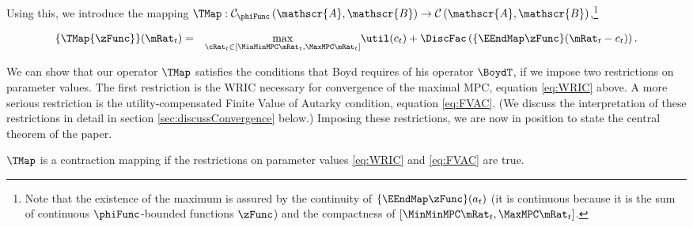 \documentclass[titlepage]{\econtex}\providecommand{\texname}{BufferStockTheory}
\begin{document}
Using this, we introduce the mapping \textit{$\TMap:\mathcal{C}_{\phiFunc }\left( \mathscr{A},\mathscr{B}\right) \rightarrow \mathcal{C}\left(
    \mathscr{A},\mathscr{B}\right) $},\footnote{Note that the existence of the maximum is assured by the continuity of $\{\EEndMap \zFunc\}(a_{t})$ (it is continuous because it is the sum of continuous $\phiFunc$-bounded functions $\zFunc$) and the compactness of $[\MinMinMPC \mRat_{t},  \MaxMPC \mRat_{t}]$.}
\begin{comment} %
(In the subtle case when $\MinMinMPC=0$, the compact interval could be revised as $ [(\MinMinMPC+\epsilon) \mRat_{t},
  \MaxMPC \mRat_{t}]$ where $\epsilon$ is a very small positive number because obviously $\MinMinMPC \mRat_{t}=0$ will not be the $\argmax$)
\end{comment}
\begin{eqnarray}
\{\TMap{\zFunc}\}(\mRat_{t}) &=&\underset{{\cRat}_{t} \in
[\MinMinMPC \mRat_{t}, \MaxMPC \mRat_{t}]
} \max
\util(c_{t})+\DiscFac \left( \{\EEndMap \zFunc \}(\mRat_{t}-c_{t}) \right)  \label{definitionmappingT}.
\end{eqnarray}


\begin{comment}
Unpacking the definitions, our mapping $\TMap$ can be written more explicitly as
\begin{eqnarray}
\{\TMap\zFunc\}(\mRat_{t}) &=&\underset{\cRat_{t} \in [\MinMinMPC
  \mRat_{t}, \MaxMPC \mRat_{t}]} \max \left\{
\util(c_{t})+\DiscFac \Ex_{t}\left[ {\PGro}_{t+1} ^{1-\CRRA }\zFunc(
{\aRat}_{t}\Rnorm_{t+1}+\tShkAll_{t+1}) \right] \right\}
.
\end{eqnarray}
\end{comment}

\hypertarget{Contraction-Conditions}{}

We can show that our operator $\TMap$ satisfies the conditions that
Boyd requires of his operator $\BoydT$, if we impose two restrictions
on parameter values.  The first restriction is the WRIC necessary for
convergence of the maximal MPC, equation \eqref{eq:WRIC} above.  A
more serious restriction is the utility-compensated Finite Value of
Autarky condition, equation \eqref{eq:FVAC}.  (We discuss the
interpretation of these restrictions in detail in section
\ref{sec:discussConvergence} below.)  Imposing these restrictions, we
are now in position to state the central theorem of the paper.

\setcounter{theorem}{0}
\begin{theorem}
  \label{thm:contmap} $\TMap$ is a contraction mapping if
  the restrictions on parameter values \eqref{eq:WRIC} and
  \eqref{eq:FVAC} are true.
\end{theorem}
\end{document}
